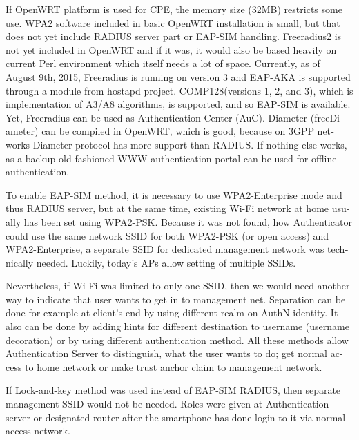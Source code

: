 \documentclass[12pt,a4paper,english]{tutthesis}
\begin{document}
\begin{otherlanguage}{english}
If OpenWRT platform is used for CPE, the memory size (32MB) restricts
some use.
WPA2 software included in basic OpenWRT installation is small,
but that does not yet include RADIUS server part or EAP-SIM handling.
Freeradius2 is not yet included in OpenWRT and if it was, it would
also be based heavily on current Perl environment which itself needs a
lot of space.  Currently, as of August 9th, 2015, Freeradius is
running on version 3 and EAP-AKA is supported through a module from
hostapd project.  COMP128(versions 1, 2, and 3), which is
implementation of A3/A8 algorithms, is supported\cite{freeradius2},
and so EAP-SIM is available.  Yet, Freeradius can be used as
Authentication Center (AuC).  Diameter (freeDiameter) can be compiled
in OpenWRT, which is good, because on 3GPP networks Diameter protocol
has more support than RADIUS.  If nothing else works, as a backup
old-fashioned WWW-authentication portal can be used for offline
authentication.










To enable EAP-SIM method, it is necessary to use WPA2-Enterprise mode
and thus RADIUS server, but at the same time, existing Wi-Fi network at
home usually has been set using WPA2-PSK.
Because it was not found, how Authenticator could use the same network
SSID for both WPA2-PSK (or open access) and WPA2-Enterprise, a
separate SSID for dedicated management network was technically needed.
Luckily, today's APs allow setting of multiple SSIDs.

Nevertheless, if Wi-Fi was limited to only one SSID, then we would
need another 
way to indicate that user wants to get in to management net. 
Separation can be done for example at client's  end by using different realm on
AuthN identity. It also can be done by adding hints for different destination to
username (username decoration) or by using different authentication
method. All these methods allow Authentication Server to distinguish, what the user
wants to do; get normal access to home network or make trust anchor claim to 
management network.

If Lock-and-key method was used instead of EAP-SIM RADIUS, then
separate manage\-ment SSID would not be needed. Roles were given at
Authentication server or designated router after the smartphone has done login to it
via normal access network.



\end{otherlanguage}
\end{document}
